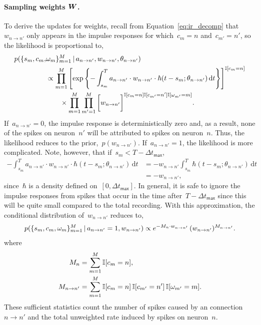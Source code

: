\paragraph{Sampling weights $\boldsymbol{W}$.} 
To derive the updates for weights, recall from
Equation~\ref{eq:ir_decomp} that~${w_{n \to n'}}$ only
appears in the impulse responses for which~${c_m=n}$
and~${c_{m'}=n'}$, so the likelihood is proportional to,
\begin{align*}
  p(\{s_m, c_m, & \omega_m\}^M_{m=1} \,|\, a_{n \to n'}, w_{n \to n'}, 
  \theta_{n \to n'}) \\
  &\propto \prod_{m=1}^M\left[
    \exp\left\{-\int^T_{s_m} a_{n \to n'} \cdot w_{n \to n'} \cdot \hbar(t - s_m; \theta_{n \to n'}) \, \mathrm{d}t
    \right\} \right]^{\mathbb{I}[c_m=n]} \\
  &\qquad \times \prod_{m=1}^M \prod_{m'=1}^M \bigg[
    w_{n \to n'}\bigg]^{\mathbb{I}[c_{m}=n] \mathbb{I}[c_{m'}=n'] \mathbb{I}[\omega_{m'}=m]}.
\end{align*}
If~${a_{n \to n'}=0}$, the impulse response is deterministically zero
and, as a result, none of the spikes on neuron~$n'$ will be attributed to spikes
on neuron~$n$. Thus, the likelihood reduces to the prior,~$p(w_{n \to n'})$.
If~${a_{n \to n'}=1}$, the likelihood is more complicated.
Note, however, that if~$s_m < T - \Delta t_{\mathsf{max}}$,
\begin{align*}
  -\int^T_{s_m} a_{n \to n'} \cdot w_{n \to n'} \cdot
  \hbar(t - s_m; \theta_{n \to n'}) \, \mathrm{d}t
  &= -w_{n \to n'}  \int^T_{s_m} \hbar(t - s_m; \theta_{n \to n'}) \, \mathrm{d}t \\
  &= - w_{n \to n'},
\end{align*}
since~$\hbar$ is a density defined on~$[0,\Delta t_{\mathsf{max}}]$.
In general, it is safe to ignore the impulse responses from spikes that 
occur in the time after~$T-\Delta t_{\mathsf{max}}$ since this will be 
quite small compared to the total recording. 
With this approximation, the conditional distribution of~$w_{n \to n'}$
reduces to,
\begin{align*}
  p(\{s_m,c_m, \omega_m\}^M_{m=1} \,|\, a_{n \to n'}=1, w_{n \to n'}) 
  \propto 
  e^{-M_n \cdot w_{n \to n'}}  \,
  (w_{n \to n'})^{M_{n \to n'}}.
\end{align*}
where
\begin{align*}
  M_{n} &= \sum_{m=1}^M \mathbb{I}[c_{m}=n], \\
  M_{n \to n'} &= \sum_{m=1}^M \mathbb{I}[c_{m}=n] \, \mathbb{I}[c_{m'}=n'] \, \mathbb{I}[\omega_{m'}=m].
\end{align*}
These sufficient statistics count the number of spikes caused
by an connection~${n \to n'}$ and the total unweighted rate induced by
spikes on neuron~$n$.

